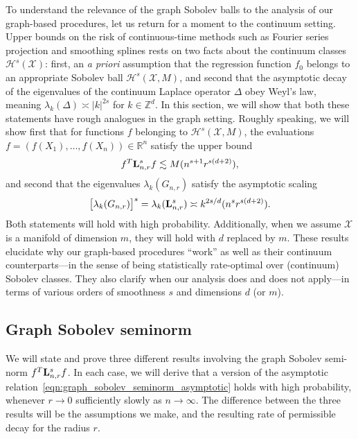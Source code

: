 \documentclass{article}
\newcommand{\Reals}{\mathbb{R}}
\newcommand{\abs}[1]{\left \lvert #1 \right \rvert}
\newcommand{\1}{\mathbf{1}}
\newcommand{\Lap}{{\bf L}}
\newcommand{\Xset}{\mathcal{X}}
\newcommand{\mc}[1]{\mathcal{#1}}
\theoremstyle{alden}
\theoremstyle{aldenthm}
\theoremstyle{definition}
\theoremstyle{remark}
\begin{document}
To understand the relevance of the graph Sobolev balls to the analysis of our graph-based procedures, let us return for a moment to the continuum setting. Upper bounds on the risk of continuous-time methods such as Fourier series projection and smoothing splines rests on two facts about the continuum classes $\mc{H}^s(\Xset)$: first, an \textit{a priori} assumption that the regression function $f_0$ belongs to an appropriate Sobolev ball $\mc{H}^{s}(\Xset,M)$, and second that the asymptotic decay of the eigenvalues of the continuum Laplace operator $\Delta$ obey Weyl's law, meaning $\lambda_k(\Delta) \asymp \abs{k}^{2s}$ for $k \in \mathbb{Z}^d$. In this section, we will show that both these statements have rough analogues in the graph setting. Roughly speaking, we will show first that for functions $f$ belonging to $\mc{H}^s(\Xset, M)$, the evaluations $f = (f(X_1),\ldots,f(X_n)) \in \Reals^n$ satisfy the upper bound
\begin{equation}
\label{eqn:graph_sobolev_seminorm_asymptotic}
f^T \Lap_{n,r}^s f \lesssim M(n^{s + 1}r^{s(d + 2)}),
\end{equation}
and second that the eigenvalues $\lambda_k(G_{n,r})$ satisfy the asymptotic scaling
\begin{equation}
\label{eqn:neighborhood_graph_eigenvalue_asymptotic}
\bigl[\lambda_k(G_{n,r})\bigr]^s = \lambda_k(\Lap_{{n,r}}^s) \asymp k^{2s/d} (n^s r^{s(d + 2)}).
\end{equation}
Both statements will hold with high probability. Additionally, when we assume $\Xset$ is a manifold of dimension $m$, they will hold with $d$ replaced by $m$. These results elucidate why our graph-based procedures ``work'' as well as their continuum counterparts---in the sense of being statistically rate-optimal over (continuum) Sobolev classes. They also clarify when our analysis does and does not apply---in terms of various orders of smoothness $s$ and dimensions $d$ (or $m$).

\subsection{Graph Sobolev seminorm}
\label{subsec:graph_sobolev_seminorm}
We will state and prove three different results involving the graph Sobolev semi-norm $f^T \Lap_{n,r}^s f$. In each case, we will derive that a version of the asymptotic relation~\eqref{eqn:graph_sobolev_seminorm_asymptotic} holds with high probability, whenever $r \to 0$ sufficiently slowly as $n \to \infty$. The difference between the three results will be the assumptions we make, and the resulting rate of permissible decay for the radius $r$. 
\end{document}
